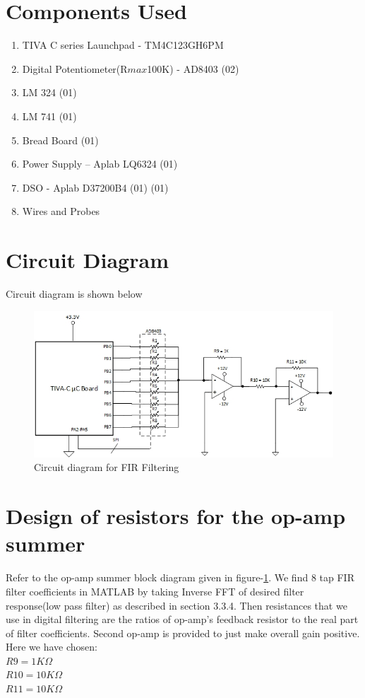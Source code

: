 \documentclass[a4paper,12pt]{article}
\begin{document}
\section{Components Used}
\begin{enumerate}
	\item TIVA C series Launchpad - TM4C123GH6PM
	\item Digital Potentiometer(R$max$100K) - AD8403 \cite{dpot_datasheet} (02)
	\item LM 324 (01)
	\item LM 741 (01)
	\item Bread Board (01)
	\item Power Supply – Aplab LQ6324 (01)
	\item DSO - Aplab D37200B4 (01)
	 (01)
	\item Wires and Probes
\end{enumerate}

\section{Circuit Diagram}
Circuit diagram is shown below
\begin{figure}[!ht]
	\centering
	\includegraphics[scale=0.8]{circuit-dig}
	\caption{Circuit diagram for FIR Filtering}
	\label{fig:circuit}
\end{figure}

\section{Design of resistors for the op-amp summer}
Refer to the op-amp summer block diagram given in figure-\ref{fig:circuit}. We find 8 tap FIR filter coefficients in MATLAB by taking Inverse FFT of desired filter response(low pass filter) as described in section 3.3.4. Then resistances that we use in digital filtering are the ratios of op-amp’s feedback resistor to the real part of filter coefficients. Second op-amp is provided to just make overall gain positive.\\
Here we have chosen: \\[1mm]
$R9 = 1 K\Omega$	\\
$R10 = 10 K\Omega$	\\	
$R11 = 10 K\Omega$	\\
\end{document}
